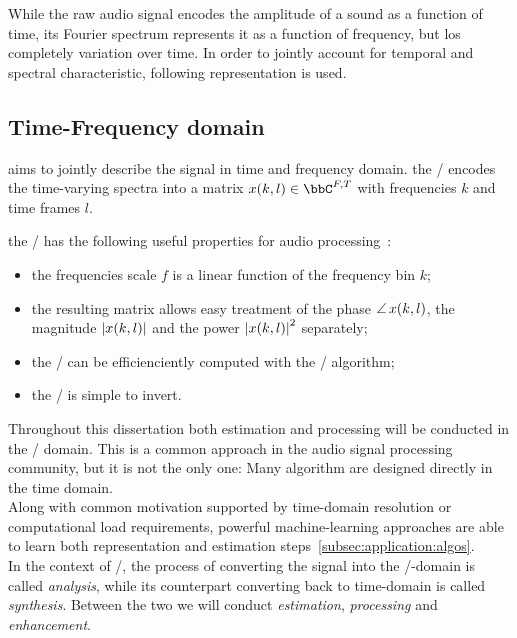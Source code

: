 While the raw audio signal encodes the amplitude of a sound as a function of time,
its Fourier spectrum represents it as a function of frequency, but los completely variation over time.
In order to jointly account for temporal and spectral characteristic, following representation is used.

\subsection{Time-Frequency domain}
 aims to jointly describe the signal in time and frequency domain.
the \STFTdef/ encodes the time-varying spectra into a matrix $x(k,l) \in \bbC^{F,T}$ with frequencies $k$ and time frames $l$.

the \STFT/ has the following useful properties for audio processing~\cite{vincent2018audio}:
\begin{itemize}
    \item the frequencies scale $f$ is a linear function of the frequency bin $k$;
    \item the resulting matrix allows easy treatment of
          the phase $\operatorname*{\angle}{x(k,l)}$, the magnitude $\magnitudeOf{x(k,l)}$ and the power $\powerOf{x(k,l)}$ separately;
    \item the \DFT/ can be efficienciently computed with the \FFT/ algorithm;
    \item the \STFT/ is simple to invert.
\end{itemize}

Throughout this dissertation both estimation and processing will be conducted in the  \TF/ domain.
This is a common approach in the audio signal processing community, but it is not the only one:
Many algorithm are designed directly in the time domain.
\\Along with common motivation supported by time-domain resolution or computational load requirements,
powerful machine-learning approaches are able to learn both representation and estimation steps~\cref{subsec:application:algos}.
\\In the context of \STFT/, the process of converting the signal into the \TF/-domain is called \textit{analysis}, while
its counterpart converting back to time-domain is called \textit{synthesis}.
Between the two we will conduct \textit{estimation}, \textit{processing} and \textit{enhancement}.


